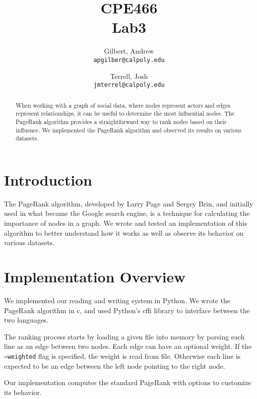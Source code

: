 \documentclass[draft]{report}
\title{CPE466\\Lab3}
\author{
  Gilbert, Andrew\\
  \texttt{apgilber@calpoly.edu}
  \and
  Terrell, Josh\\
  \texttt{jmterrel@calpoly.edu}
}
\date{}
\begin{document}
\maketitle

\begin{abstract}
When working with a graph of social data, where nodes represent actors and edges
represent relationships, it can be useful to determine the most influential
nodes. The PageRank algorithm provides a straightforward way to rank nodes based
on their influence. We implemented the PageRank algorithm and observed its
results on various datasets.
\end{abstract}

\section{Introduction}
The PageRank algorithm, developed by Larry Page and Sergey Brin, and initially
used in what became the Google search engine, is a technique for calculating the
importance of nodes in a graph. We wrote and tested an implementation of this
algorithm to better understand how it works as well as observe its behavior on
various datasets.

\section{Implementation Overview}
We implemented our reading and writing system in Python. We wrote the
PageRank algorithm in c, and used Python's cffi library to interface between
the two languages.

The ranking process starts by loading a given file into memory by parsing each
line as an edge between two nodes. Each edge can have an optional weight. If the
\texttt{--weighted} flag is specified, the weight is read from file. Otherwise
each line is expected to be an edge between the left node pointing to the right
node.

Our implementation computes the standard PageRank with options to customize its
behavior. 
\end{document}
